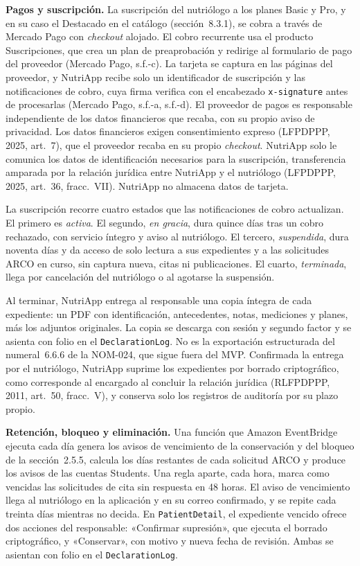 \documentclass[12pt, a4paper]{article}
\begin{document}
\textbf{Pagos y suscripción.} La suscripción del nutriólogo a los planes
Basic y Pro, y en su caso el Destacado en el catálogo (sección~8.3.1),
se cobra a través de Mercado Pago con \textit{checkout} alojado. El
cobro recurrente usa el producto Suscripciones, que crea un plan de
preaprobación y redirige al formulario de pago del proveedor (Mercado
Pago, s.f.-c). La tarjeta se captura en las páginas del proveedor, y
NutriApp recibe solo un identificador de suscripción y las
notificaciones de cobro, cuya firma verifica con el encabezado
\texttt{x-signature} antes de procesarlas (Mercado Pago, s.f.-a,
s.f.-d). El proveedor de pagos es responsable independiente de los datos
financieros que recaba, con su propio aviso de privacidad. Los datos
financieros exigen consentimiento expreso (LFPDPPP, 2025, art.~7), que
el proveedor recaba en su propio \textit{checkout}. NutriApp solo le
comunica los datos de identificación necesarios para la suscripción,
transferencia amparada por la relación jurídica entre NutriApp y el
nutriólogo (LFPDPPP, 2025, art.~36, fracc.~VII). NutriApp no almacena
datos de tarjeta.

La suscripción recorre cuatro estados que las notificaciones de cobro
actualizan. El primero es \textit{activa}. El segundo, \textit{en
gracia}, dura quince días tras un cobro rechazado, con servicio íntegro
y aviso al nutriólogo. El tercero, \textit{suspendida}, dura noventa
días y da acceso de solo lectura a sus expedientes y a las solicitudes
ARCO en curso, sin captura nueva, citas ni publicaciones. El cuarto,
\textit{terminada}, llega por cancelación del nutriólogo o al agotarse
la suspensión.

Al terminar, NutriApp entrega al responsable una copia íntegra de cada
expediente: un PDF con identificación, antecedentes, notas, mediciones y
planes, más los adjuntos originales. La copia se descarga con sesión y
segundo factor y se asienta con folio en el \texttt{DeclarationLog}. No
es la exportación estructurada del numeral~6.6.6 de la NOM-024, que
sigue fuera del MVP. Confirmada la entrega por el nutriólogo, NutriApp
suprime los expedientes por borrado criptográfico, como corresponde al
encargado al concluir la relación jurídica (RLFPDPPP, 2011, art.~50,
fracc.~V), y conserva solo los registros de auditoría por su plazo
propio.
 
\textbf{Retención, bloqueo y eliminación.} Una función que Amazon
EventBridge ejecuta cada día genera los avisos de vencimiento de la
conservación y del bloqueo de la sección~2.5.5, calcula los días
restantes de cada solicitud ARCO y produce los avisos de las cuentas
Students. Una regla aparte, cada hora, marca como vencidas las
solicitudes de cita sin respuesta en 48 horas. El aviso de vencimiento
llega al nutriólogo en la aplicación y en su correo confirmado, y se
repite cada treinta días mientras no decida. En \texttt{PatientDetail},
el expediente vencido ofrece dos acciones del responsable: «Confirmar
supresión», que ejecuta el borrado criptográfico, y «Conservar», con
motivo y nueva fecha de revisión. Ambas se asientan con folio en el
\texttt{DeclarationLog}.
\end{document}
